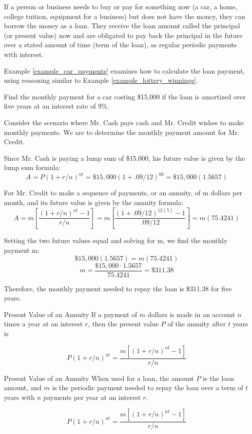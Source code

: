 If a person or business needs to buy or pay for something now (a car, a home, college tuition, equipment for a business) but does not have the money, they can borrow the money as a loan. They receive the loan amount called the principal (or present value) now and are obligated to pay back the principal in the future over a stated amount of time (term of the loan), as regular periodic payments with interest.

Example \ref{example_car_payments} examines how to calculate the loan payment, using reasoning similar to Example \ref{example_lottery_winnings}.

\begin{example}\label{example_car_payments}
    Find the monthly payment for a car costing \$15,000 if the loan is amortized over five years at an interest rate of 9\%.
\end{example}

\begin{solution}
    Consider the scenario where Mr. Cash pays cash and Mr. Credit wishes to make monthly payments. We are to determine the monthly payment amount for Mr. Credit.

    Since Mr. Cash is paying a lump sum of \$15,000, his future value is given by the lump sum formula:
    \[ A = P(1 + r/n)^{nt} = \$15,000(1 + .09/12)^{60} = \$15,000(1.5657)\]

    For Mr. Credit to make a sequence of payments, or an annuity, of m dollars per month, and its future value is given by the annuity formula:
    \[ A = m\left[\frac{(1 + r/n)^{nt} - 1}{r/n}\right] = m\left[\frac{(1 + .09/12)^{12(5)} - 1}{.09/12}\right] = m(75.4241)\]

    Setting the two future values equal and solving for m, we find the monthly payment m:
    \[ \$15,000(1.5657) = m(75.4241) \]
    \[ m = \frac{\$15,000 \cdot 1.5657}{75.4241} = \$311.38 \]

    Therefore, the monthly payment needed to repay the loan is \$311.38 for five years.
\end{solution}


\begin{summarybox}{Present Value of an Annuity}\label{summary_annuity_present_value}
    If a payment of \( m \) dollars is made in an account \( n \) times a year at an interest \( r \), then the present value \( P \) of the annuity after \( t \) years is

    \[
        P(1 + r/n)^{nt} = \frac{m[(1 + r/n)^{nt} - 1]}{r/n}
    \]
\end{summarybox}
\begin{summarybox}{Present Value of an Annuity}
    When used for a loan, the amount \( P \) is the loan amount, and \( m \) is the periodic payment needed to repay the loan over a term of \( t \) years with \( n \) payments per year at an interest \( r \).

    \[
        P(1 + r/n)^{nt} = \frac{m[(1 + r/n)^{nt} - 1]}{r/n}
    \]

\end{summarybox}

